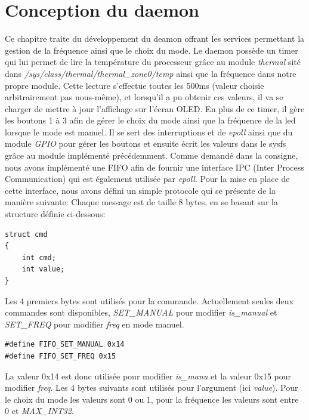 \documentclass{ReportTemplate}
\begin{document}
\chapter{Conception du daemon}
Ce chapitre traite du développement du deamon offrant les services permettant la
gestion de la fréquence ainsi que le choix du mode.\newline
Le daemon possède un timer qui lui permet de lire la température du processeur
grâce au module \textit{thermal} sité dans
\textit{/sys/class/thermal/thermal\_zone0/temp} ainsi que la fréquence dans notre
propre module. Cette lecture s'effectue toutes les 500ms (valeur choisie
arbitrairement pas nous-même), et lorsqu'il a pu obtenir ces valeurs, il va se
charger de mettre à jour l'affichage sur l'écran OLED. \newline
En plus de ce timer, il gère les boutons 1 à 3 afin de gérer le choix du mode
ainsi que la fréquence de la led lorsque le mode est manuel. Il se sert des
interruptions et de \textit{epoll} ainsi que du module \textit{GPIO} pour gérer
les boutons et ensuite écrit les valeurs dans le sysfs grâce au module
implémenté précédemment.\newline
Comme demandé dans la consigne, nous avons implémenté une FIFO afin de fournir
une interface IPC (Inter Process Communication) qui est également utilisée par
\textit{epoll}. Pour la mise en place de cette interface, nous avons défini un
simple protocole qui se présente de la manière suivante:\newline
Chaque message est de taille 8 bytes, en se basant sur la structure définie ci-dessous:
\begin{verbatim}
struct cmd
{
    int cmd;
    int value;
}
\end{verbatim}
Les 4 premiers bytes sont utilisés pour la commande.
Actuellement seules deux commandes sont disponibles, \textit{SET\_MANUAL} pour
modifier \textit{is\_manual} et \textit{SET\_FREQ} pour modifier \textit{freq} en
mode manuel.
\begin{verbatim}
#define FIFO_SET_MANUAL 0x14
#define FIFO_SET_FREQ 0x15
\end{verbatim}
La valeur 0x14 est donc utilisée pour modifier \textit{is\_manu} et la valeur
0x15 pour modifier \textit{freq}.\newline
Les 4 bytes suivants sont utilisés pour l'argument (ici \textit{value}). Pour le
choix du mode les valeurs sont 0 ou 1, pour la fréquence les valeurs sont entre
0 et \textit{MAX\_INT32}.\newline
\end{document}
